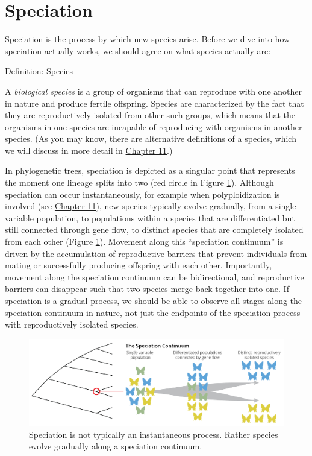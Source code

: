\documentclass[
]{book}
\begin{document}
\hypertarget{speciation}{%
\section{Speciation}\label{speciation}}

Speciation is the process by which new species arise. Before we dive into how speciation actually works, we should agree on what species actually are:

Definition: Species

A \emph{biological species} is a group of organisms that can reproduce with one another in nature and produce fertile offspring. Species are characterized by the fact that they are reproductively isolated from other such groups, which means that the organisms in one species are incapable of reproducing with organisms in another species. (As you may know, there are alternative definitions of a species, which we will discuss in more detail in \href{speciation-1.html}{Chapter 11}.)

In phylogenetic trees, speciation is depicted as a singular point that represents the moment one lineage splits into two (red circle in Figure \ref{fig:speccont}). Although speciation can occur instantaneously, for example when polyploidization is involved (see \href{speciation-1.html}{Chapter 11}), new species typically evolve gradually, from a single variable population, to populations within a species that are differentiated but still connected through gene flow, to distinct species that are completely isolated from each other (Figure \ref{fig:speccont}). Movement along this ``speciation continuum'' is driven by the accumulation of reproductive barriers that prevent individuals from mating or successfully producing offspring with each other. Importantly, movement along the speciation continuum can be bidirectional, and reproductive barriers can disappear such that two species merge back together into one. If speciation is a gradual process, we should be able to observe all stages along the speciation continuum in nature, not just the endpoints of the speciation process with reproductively isolated species.

\begin{figure}
\includegraphics[width=1\linewidth]{images/speciation_continuum} \caption{Speciation is not typically an instantaneous process. Rather species evolve gradually along a speciation continuum.}\label{fig:speccont}
\end{figure}
\end{document}
